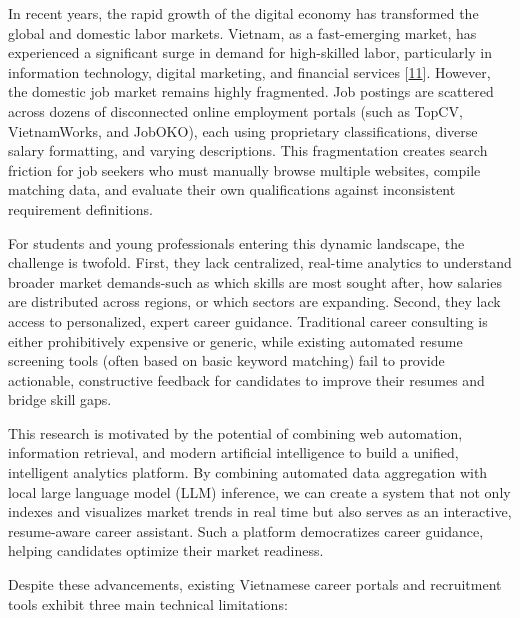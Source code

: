 \documentclass[12pt, a4paper]{report}
\begin{document}
\setlength{\parindent}{0.7cm}
\setlength{\parskip}{0.1cm}

In recent years, the rapid growth of the digital economy has transformed the global and domestic labor markets. Vietnam, as a fast-emerging market, has experienced a significant surge in demand for high-skilled labor, particularly in information technology, digital marketing, and financial services [\hyperlink{cite11}{11}]. However, the domestic job market remains highly fragmented. Job postings are scattered across dozens of disconnected online employment portals (such as TopCV, VietnamWorks, and JobOKO), each using proprietary classifications, diverse salary formatting, and varying descriptions. This fragmentation creates search friction for job seekers who must manually browse multiple websites, compile matching data, and evaluate their own qualifications against inconsistent requirement definitions.

For students and young professionals entering this dynamic landscape, the challenge is twofold. First, they lack centralized, real-time analytics to understand broader market demands-such as which skills are most sought after, how salaries are distributed across regions, or which sectors are expanding. Second, they lack access to personalized, expert career guidance. Traditional career consulting is either prohibitively expensive or generic, while existing automated resume screening tools (often based on basic keyword matching) fail to provide actionable, constructive feedback for candidates to improve their resumes and bridge skill gaps.

This research is motivated by the potential of combining web automation, information retrieval, and modern artificial intelligence to build a unified, intelligent analytics platform. By combining automated data aggregation with local large language model (LLM) inference, we can create a system that not only indexes and visualizes market trends in real time but also serves as an interactive, resume-aware career assistant. Such a platform democratizes career guidance, helping candidates optimize their market readiness.

\vspace{0.8cm}
\vspace{0.4cm}

Despite these advancements, existing Vietnamese career portals and recruitment tools exhibit three main technical limitations:
\end{document}
